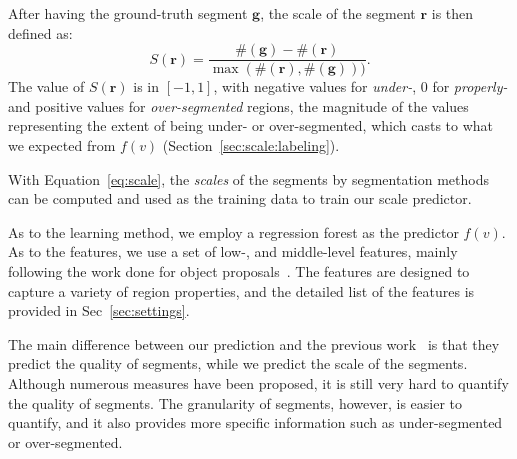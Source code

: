 After having the ground-truth segment $\mathbf{g}$, the scale of the
segment $\mathbf{r}$ is then defined as:
\begin{equation}
\label{eq:scale}
S(\mathbf{r}) = \frac{\#(\mathbf{g}) - \#(\mathbf{r})}{\max( \#(\mathbf{r}), \#(\mathbf{g})))}.
\end{equation}
The value of $S(\mathbf{r})$ is in $[-1, 1]$, with negative values for
\emph{under-}, $0$ for \emph{properly-} and positive values for
\emph{over-segmented} regions, the magnitude of the values representing the extent of being under- or over-segmented, which casts to what we expected from
$f(v)$ (\cf Section~\ref{sec:scale:labeling}). 

With Equation~\ref{eq:scale}, the \emph{scales} of the segments by
segmentation methods can be computed and used as the training data to
train our scale predictor.

As to the learning method, we employ a regression forest as the predictor $f(v)$.
As to the features, we use a set of low-, and middle-level features, mainly following the work
done for object proposals~\cite{carreira2010constrained,arbelaez2014multiscale}.
The features are designed to capture a variety of region properties, and the detailed list of the features is provided in Sec~\ref{sec:settings}.

The main difference between our prediction and the previous
work~\cite{carreira2010constrained, ren2003learning, arbelaez2014multiscale} is that they predict the quality of segments, while we
predict the scale of the segments. Although numerous measures have
been proposed, it is still very hard to quantify the quality of
segments.
The granularity of segments, however, is easier to quantify,
and it also provides more specific information such as under-segmented
or over-segmented.



